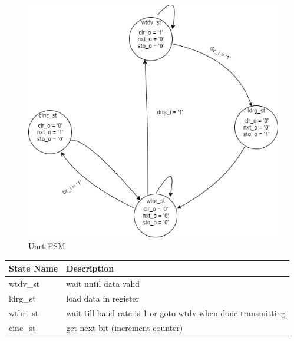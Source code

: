 \documentclass[12pt,a4 paper] {report}
\begin{document}
\begin{figure}[h]
	\centering	
	\includegraphics[scale=0.5]{../png/uart.png}
	\caption{Uart FSM}
\end{figure}
\begin{center}
 \begin{tabular}{| p{4cm} | p{7cm} |}
	 \hline
	 \textbf{State Name} & \textbf{Description} \\
	 \hline
	 wtdv\_st & wait until data valid \\
	 \hline
	 ldrg\_st & load data in register \\
	 \hline
	 wtbr\_st & wait till baud rate is 1 or goto wtdv when done transmitting \\
	 \hline
	 cinc\_st & get next bit (increment counter) \\
	 \hline
 \end{tabular}
\end{center}

\newpage
\end{document}
